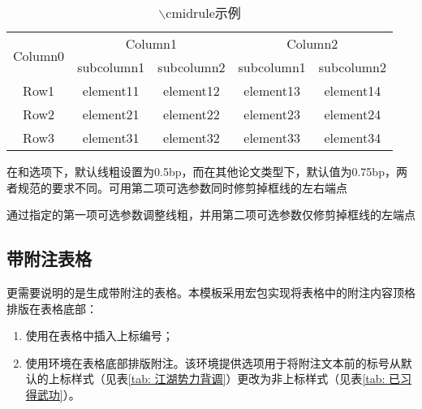 \documentclass[print, doctor, vlined]{DissertUESTC}
\begin{document}
	\begin{table}[htp]
		\caption{$\backslash$cmidrule示例}\label{tab: cmidrule示例}
		\begin{threeparttable}
			\begin{tabular}{ccccc}
				\toprule
				\multirow{2}{*}{Column0} &  \multicolumn{2}{c}{Column1\tnote{1}} & \multicolumn{2}{c}{Column2\tnote{2}} \\
				\cmidrule(lr){2-3}\cmidrule[2.5bp](l){4-5}
				~     & subcolumn1 & subcolumn2 & subcolumn1 & subcolumn2 \\
				\midrule
				Row1  & element11 & element12 &element13 & element14 \\
				Row2  & element21 & element22 &element23 & element24 \\
				\cmidrule{2-3}\cmidrule[2.5bp]{4-5}
				Row3  & element31 & element32 &element33 & element34 \\
				\bottomrule
			\end{tabular}
			\begin{tablenotes}
				\item[1] 在和选项下，默认线粗设置为0.5bp，而在其他论文类型下，默认值为0.75bp，两者规范的要求不同。可用第二项可选参数同时修剪掉框线的左右端点
				\item[2] 通过指定的第一项可选参数调整线粗，并用第二项可选参数仅修剪掉框线的左端点
			\end{tablenotes}
		\end{threeparttable}
	\end{table}

	
	\newpage
	\subsection{带附注表格}
	
	更需要说明的是生成带附注的表格。本模板采用宏包实现将表格中的附注内容顶格排版在表格底部：
	\begin{enumerate}
		\item 使用在表格中插入上标编号；
		\setcounter{enumi}{98}
		\item 使用环境在表格底部排版附注。该环境提供选项用于将附注文本前的标号从默认的上标样式（见表\ref{tab: 江湖势力背调}）更改为非上标样式（见表\ref{tab: 已习得武功}）。
	\end{enumerate}
	
\end{document}
